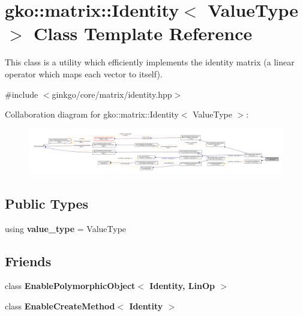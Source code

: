 \hypertarget{classgko_1_1matrix_1_1Identity}{}\section{gko\+:\+:matrix\+:\+:Identity$<$ Value\+Type $>$ Class Template Reference}
\label{classgko_1_1matrix_1_1Identity}


This class is a utility which efficiently implements the identity matrix (a linear operator which maps each vector to itself).  




{\ttfamily \#include $<$ginkgo/core/matrix/identity.\+hpp$>$}



Collaboration diagram for gko\+:\+:matrix\+:\+:Identity$<$ Value\+Type $>$\+:
\nopagebreak
\begin{figure}[H]
\begin{center}
\leavevmode
\includegraphics[width=350pt]{classgko_1_1matrix_1_1Identity__coll__graph}
\end{center}
\end{figure}
\subsection*{Public Types}
\begin{DoxyCompactItemize}
\item 
\mbox{\label{classgko_1_1matrix_1_1Identity_aa84aa862065ce17dde7941b77d0ca209}} 
using {\bfseries value\+\_\+type} = Value\+Type
\end{DoxyCompactItemize}
\subsection*{Friends}
\begin{DoxyCompactItemize}
\item 
\mbox{\label{classgko_1_1matrix_1_1Identity_ab9d7730057c8c909a698f79f71c901d8}} 
class {\bfseries Enable\+Polymorphic\+Object$<$ Identity, Lin\+Op $>$}
\item 
\mbox{\label{classgko_1_1matrix_1_1Identity_aef11cbf5c667400c66e803f76cb5d520}} 
class {\bfseries Enable\+Create\+Method$<$ Identity $>$}
\end{DoxyCompactItemize}
